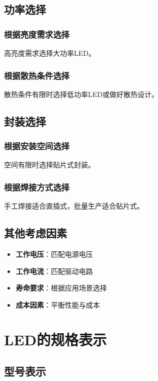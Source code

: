 \subsection{功率选择}

\subsubsection{根据亮度需求选择}
高亮度需求选择大功率LED。

\subsubsection{根据散热条件选择}
散热条件有限时选择低功率LED或做好散热设计。

\subsection{封装选择}

\subsubsection{根据安装空间选择}
空间有限时选择贴片式封装。

\subsubsection{根据焊接方式选择}
手工焊接适合直插式，批量生产适合贴片式。

\subsection{其他考虑因素}
\begin{itemize}
    \item \textbf{工作电压}：匹配电源电压
    \item \textbf{工作电流}：匹配驱动电路
    \item \textbf{寿命要求}：根据应用场景选择
    \item \textbf{成本因素}：平衡性能与成本
\end{itemize}

\section{LED的规格表示}
\label{sec:led_specifications}

\subsection{型号表示}

